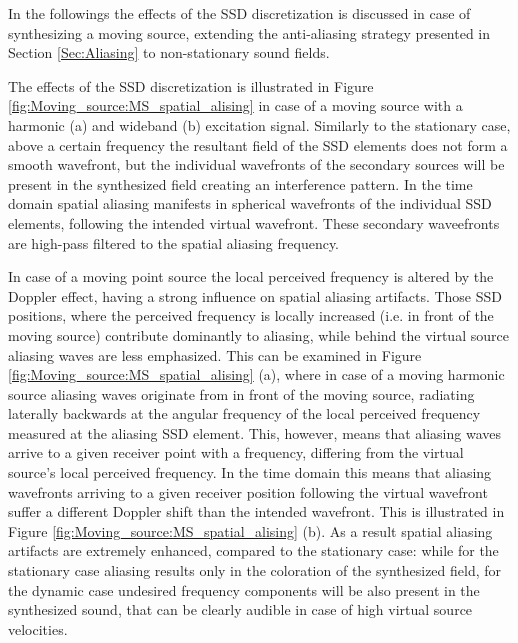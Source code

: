 In the followings the effects of the SSD discretization is discussed in case of synthesizing a moving source, extending the anti-aliasing strategy presented in Section \ref{Sec:Aliasing} to non-stationary sound fields.

The effects of the SSD discretization is illustrated in Figure \ref{fig:Moving_source:MS_spatial_alising} in case of a moving source with a harmonic (a) and wideband (b) excitation signal.
Similarly to the stationary case, above a certain frequency the resultant field of the SSD elements does not form a smooth wavefront, but the individual wavefronts of the secondary sources will be present in the synthesized field creating an interference pattern.
In the time domain spatial aliasing manifests in spherical wavefronts of the individual SSD elements, following the intended virtual wavefront.
These secondary waveefronts are high-pass filtered to the spatial aliasing frequency.

In case of a moving point source the local perceived frequency is altered by the Doppler effect, having a strong influence on spatial aliasing artifacts.
Those SSD positions, where the perceived frequency is locally increased (i.e. in front of the moving source) contribute dominantly to aliasing, while behind the virtual source aliasing waves are less emphasized.
This can be examined in Figure \ref{fig:Moving_source:MS_spatial_alising} (a), where in case of a moving harmonic source aliasing waves originate from in front of the moving source, radiating laterally backwards at the angular frequency of the local perceived frequency measured at the aliasing SSD element.
This, however, means that aliasing waves arrive to a given receiver point with a frequency, differing from the virtual source's local perceived frequency.
In the time domain this means that aliasing wavefronts arriving to a given receiver position following the virtual wavefront suffer a different Doppler shift than the intended wavefront.
This is illustrated in Figure \ref{fig:Moving_source:MS_spatial_alising} (b).
As a result spatial aliasing artifacts are extremely enhanced, compared to the stationary case: while for the stationary case aliasing results only in the coloration of the synthesized field, for the dynamic case undesired frequency components will be also present in the synthesized sound, that can be clearly audible in case of high virtual source velocities.

